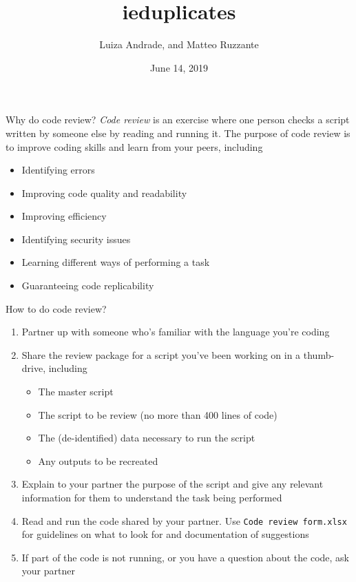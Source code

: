 \documentclass[aspectratio=169]{beamer}
\title{ieduplicates}
\date{June 14, 2019}
\author{Luiza Andrade, and Matteo Ruzzante} %
\institute{Development Impact Evaluation (DIME) \newline The World Bank }
\begin{document}
	
	{
		\maketitle
	}
	
\begin{frame}{Why do code review?}
	\textit{Code review} is an exercise where one person checks a script written by someone else by reading and running it. The purpose of code review is to improve coding skills and learn from your peers, including	
	\begin{itemize}
		\item Identifying errors
		\item Improving code quality and readability
		\item Improving efficiency
		\item Identifying security issues
		\item Learning different ways of performing a task
		\item Guaranteeing code replicability
	\end{itemize}
\end{frame}

\begin{frame}{How to do code review?}
\begin{enumerate}
	\item Partner up with someone who's familiar with the language you're coding
	\item Share the review package for a script you've been working on in a thumb-drive, including
	\begin{itemize}
		\item The master script
		\item The script to be review (no more than 400 lines of code)
		\item The (de-identified) data necessary to run the script
		\item Any outputs to be recreated 
	\end{itemize} 
	\item Explain to your partner the purpose of the script and give any relevant information for them to understand the task being performed
	\item Read and run the code shared by your partner. Use \texttt{Code review form.xlsx} for guidelines on what to look for and documentation of suggestions
	\item If part of the code is not running, or you have a question about the code, ask your partner
\end{enumerate}
\end{frame}
\end{document}
